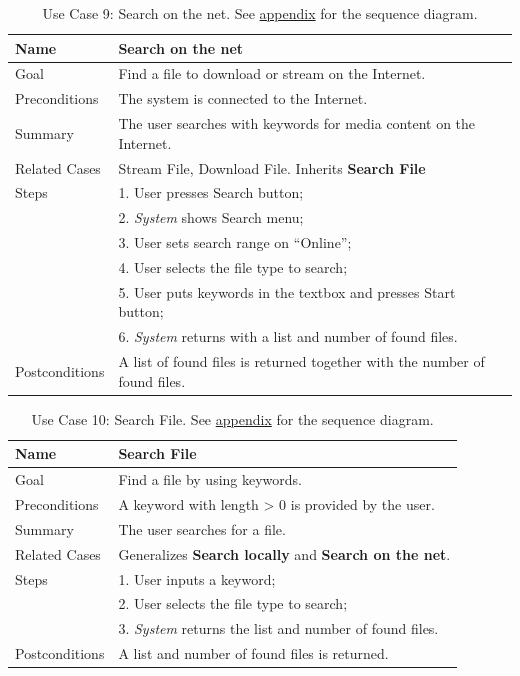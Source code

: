 \begin{table}[h!]
\centering
\begin{tabular}{|l|l|}
\hline
Name & Search on the net\\ \hline
Goal & Find a file to download or stream on the Internet.\\ \hline
Preconditions & The system is connected to the Internet. \\ \hline
Summary & The user searches with keywords for media content on the Internet.\\ \hline

Related Cases & Stream File, Download File. Inherits \textbf{Search File} \\ \hline
Steps &  1. User presses Search button; \\
      &  2. \textit{System} shows Search menu; \\
      &  3. User sets search range on ``Online''; \\
      &  4. User selects the file type to search; \\
      &  5. User puts keywords in the textbox and presses Start button; \\
      &  6. \textit{System} returns with a list and number of found files. 
        \\ \hline
Postconditions & A list of found files is returned together with the number of found files.
\\ \hline
\end{tabular}
\caption{Use Case 9: Search on the net. See \hyperref[fig:req_seq4]{appendix} for the sequence diagram.}
\label{tab:UC9}
\end{table}

\begin{table}[h!]
\centering
\begin{tabular}{|l|l|}
\hline
Name & Search File\\ \hline
Goal & Find a file by using keywords.\\ \hline
Preconditions & A keyword with length > 0 is provided by the user. \\ \hline
Summary & The user searches for a file.\\ \hline
Related Cases & Generalizes \textbf{Search locally} and \textbf{Search on the net}. \\ \hline
Steps &  1. User inputs a keyword; \\
      &  2. User selects the file type to search; \\
      &  3. \textit{System} returns the list and number of found files. 
        \\ \hline
Postconditions & A list and number of found files is returned.
\\ \hline
\end{tabular}
\caption{Use Case 10: Search File. See \hyperref[fig:req_seq4]{appendix} for the sequence diagram.}
\label{tab:UC10}
\end{table}

